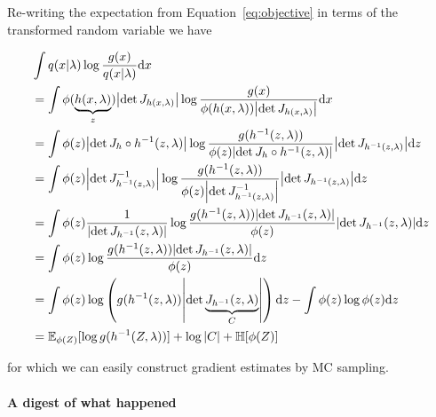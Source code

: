 \documentclass[a4paper,11pt]{article}
\begin{document}
Re-writing the expectation from Equation~\eqref{eq:objective} in terms of the transformed random variable we have
\begin{small}
\begin{subequations}
\begin{align}
& \int q(x|\lambda) \log \dfrac{g(x)}{q(x|\lambda)} \dd x \\
&= \int \phi(\underbrace{h(x, \lambda)}_{z}) \abs{\det J_{h(x, \lambda)}} \log \frac{g(x)}{\phi(h(x, \lambda)) \abs{\det J_{h(x, \lambda)}}} \dd x \label{eq:change-density}\\
&= \int \phi(z) \abs{\det J_{h} \circ h^{-1}(z, \lambda)} \log \frac{g(h^{-1}(z, \lambda))}{\phi(z) \abs{\det J_{h} \circ h^{-1}(z, \lambda)}} \abs{\det J_{h^{-1}(z, \lambda)}} \dd z \label{eq:change-variable} \\
&= \int \phi(z) \abs{\det J^{-1}_{h^{-1}(z, \lambda)}} \log \frac{g(h^{-1}(z, \lambda))}{\phi(z) \abs{\det J^{-1}_{h^{-1}(z, \lambda)}}} \abs{\det J_{h^{-1}(z, \lambda)}} \dd z \label{eq:inverse-theorem} \\
&= \int \phi(z) \frac{1}{\abs{\det J_{h^{-1}}(z, \lambda)}} \log \frac{g(h^{-1}(z, \lambda))\abs{\det J_{h^{-1}}(z, \lambda)}}{\phi(z)} \abs{\det J_{h^{-1}}(z, \lambda)} \dd z \label{eq:det} \\
&= \int \phi(z) \log \frac{g(h^{-1}(z, \lambda))\abs{\det J_{h^{-1}}(z, \lambda)}}{\phi(z)} \dd z \label{eq:cancel}\\
&= \int \phi(z) \log \left(g(h^{-1}(z, \lambda))\abs{\det \underbrace{J_{h^{-1}}(z, \lambda)}_{C}}\right) \dd z  - \int \phi(z) \log \phi(z) \dd z \label{eq:scale} \\
&= \mathbb E_{\phi(Z)}[\log g(h^{-1}(Z, \lambda))] + \log \abs{C} + \mathbb H[\phi(Z)]
\end{align}
\end{subequations}
\end{small}
for which we can easily construct gradient estimates by MC sampling.

\paragraph{A digest of what happened} 
\end{document}
